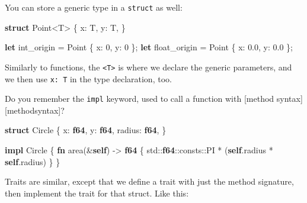 \documentclass[a4paper,]{book}
\newenvironment{Shaded}{\begin{snugshade}}{\end{snugshade}}
\newcommand{\KeywordTok}[1]{\textcolor[rgb]{0.13,0.29,0.53}{\textbf{{#1}}}}
\newcommand{\DecValTok}[1]{\textcolor[rgb]{0.00,0.00,0.81}{{#1}}}
\newcommand{\NormalTok}[1]{{#1}}
\begin{document}
You can store a generic type in a \texttt{struct} as well:

\begin{Shaded}
\begin{Highlighting}[]
\KeywordTok{struct} \NormalTok{Point<T> \{}
    \NormalTok{x: T,}
    \NormalTok{y: T,}
\NormalTok{\}}

\KeywordTok{let} \NormalTok{int_origin = Point \{ x: }\DecValTok{0}\NormalTok{, y: }\DecValTok{0} \NormalTok{\};}
\KeywordTok{let} \NormalTok{float_origin = Point \{ x: }\DecValTok{0.0}\NormalTok{, y: }\DecValTok{0.0} \NormalTok{\};}
\end{Highlighting}
\end{Shaded}

Similarly to functions, the \texttt{\textless{}T\textgreater{}} is where
we declare the generic parameters, and we then use \texttt{x:\ T} in the
type declaration, too.


Do you remember the \texttt{impl} keyword, used to call a function with
{[}method syntax{]}{[}methodsyntax{]}?

\begin{Shaded}
\begin{Highlighting}[]
\KeywordTok{struct} \NormalTok{Circle \{}
    \NormalTok{x: }\KeywordTok{f64}\NormalTok{,}
    \NormalTok{y: }\KeywordTok{f64}\NormalTok{,}
    \NormalTok{radius: }\KeywordTok{f64}\NormalTok{,}
\NormalTok{\}}

\KeywordTok{impl} \NormalTok{Circle \{}
    \KeywordTok{fn} \NormalTok{area(&}\KeywordTok{self}\NormalTok{) -> }\KeywordTok{f64} \NormalTok{\{}
        \NormalTok{std::}\KeywordTok{f64}\NormalTok{::consts::PI * (}\KeywordTok{self}\NormalTok{.radius * }\KeywordTok{self}\NormalTok{.radius)}
    \NormalTok{\}}
\NormalTok{\}}
\end{Highlighting}
\end{Shaded}

Traits are similar, except that we define a trait with just the method
signature, then implement the trait for that struct. Like this:
\end{document}
